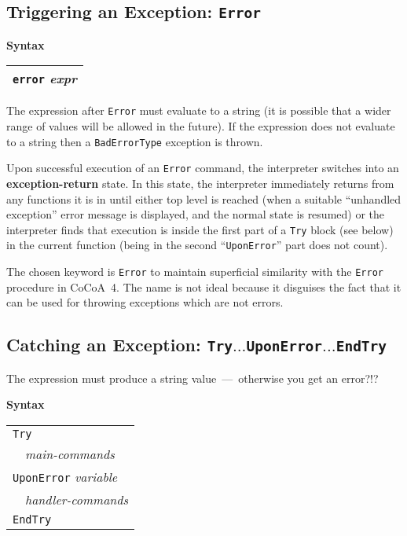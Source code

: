\documentclass{book}[12,a4paper]
\def\mydots{$...$}
\newenvironment{syntax}
{\goodbreak\noindent\textbf{Syntax}\\
 \begin{tabular}{|p{0.9\textwidth}|}\hline}
{\\\hline\end{tabular}}
\begin{document}
\subsection{Triggering an Exception: \texttt{Error}}

\begin{syntax}
\texttt{error} \textit{expr}
\end{syntax}

The expression after \texttt{Error} must evaluate to a string (it is possible
that a wider range of values will be allowed in the future).  If the
expression does not evaluate to a string then a \texttt{BadErrorType}
exception is thrown.

Upon successful execution of an \texttt{Error} command, the
interpreter switches into an {\bf exception-return} state.  In this
state, the interpreter immediately returns from any functions it is in
until either top level is reached (when a suitable ``unhandled
exception'' error message is displayed, and the normal state is
resumed) or the interpreter finds that execution is inside the first
part of a \texttt{Try} block (see below) in the current function
(being in the second ``\texttt{UponError}'' part does not count).

The chosen keyword is \texttt{Error} to maintain superficial similarity with
the \texttt{Error} procedure in CoCoA~4.  The name is not ideal because it
disguises the fact that it can be used for throwing exceptions which are
not errors.

\subsection{Catching an Exception: \texttt{Try\mydots UponError\mydots EndTry}}

The expression must produce a string value~---~otherwise you get an error?!?

\begin{syntax}
\texttt{Try} \\
\ \ {\it main-commands} \\
\texttt{UponError} {\it variable} \\
\ \ {\it handler-commands} \\
\texttt{EndTry}
\end{syntax}
\end{document}

